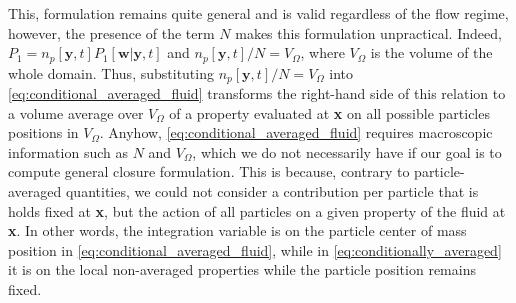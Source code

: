 This, formulation remains quite general and is valid regardless of the flow regime, however, the presence of the term $N$ makes this formulation unpractical. 
Indeed, $P_1 = n_p[\textbf{y},t] P_1[\textbf{w}|\textbf{y},t]$ and $n_p[\textbf{y},t] /N = V_\Omega$, where $V_\Omega$ is the volume of the whole domain. 
Thus, substituting  $n_p[\textbf{y},t] /N = V_\Omega$ into \ref{eq:conditional_averaged_fluid} transforms the right-hand side of this relation to a volume average over $V_\Omega$ of a property evaluated at \textbf{x} on all possible particles positions in $V_\Omega$.  
Anyhow, \ref{eq:conditional_averaged_fluid} requires macroscopic information such as $N$ and $V_\Omega$, which we do not necessarily have if our goal is to compute general closure formulation. 
This is because, contrary to particle-averaged quantities, we could not consider a contribution per particle that is holds fixed at \textbf{x}, but the action of all particles on a given property of the fluid at \textbf{x}.
In other words, the integration variable is on the particle center of mass position in \ref{eq:conditional_averaged_fluid}, while in \ref{eq:conditionally_averaged} it is on the local non-averaged properties while the particle position remains fixed. 

